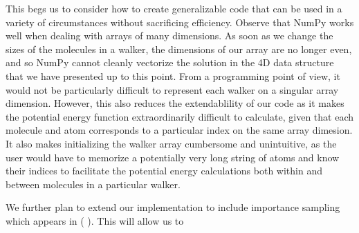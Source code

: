 \documentclass[journal=jacsat,manuscript=article]{achemso}
\begin{document}
This begs us to consider how to create generalizable code that can be used in a variety of circumstances without sacrificing efficiency. Observe that NumPy works well when dealing with arrays of many dimensions. As soon as we change the sizes of the molecules in a walker, the dimensions of our array are no longer even, and so NumPy cannot cleanly vectorize the solution in the 4D data structure that we have presented up to this point. From a programming point of view, it would not be particularly difficult to represent each walker on a singular array dimension. However, this also reduces the extendablility of our code as it makes the potential energy function extraordinarily difficult to calculate, given that each molecule and atom corresponds to a particular index on the same array dimesion. It also makes initializing the walker array cumbersome and unintuitive, as the user would have to memorize a potentially very long string of atoms and know their indices to facilitate the potential energy calculations both within and between molecules in a particular walker. 

We further plan to extend our implementation to include importance sampling which appears in ( ). This will allow us to 
\end{document}
